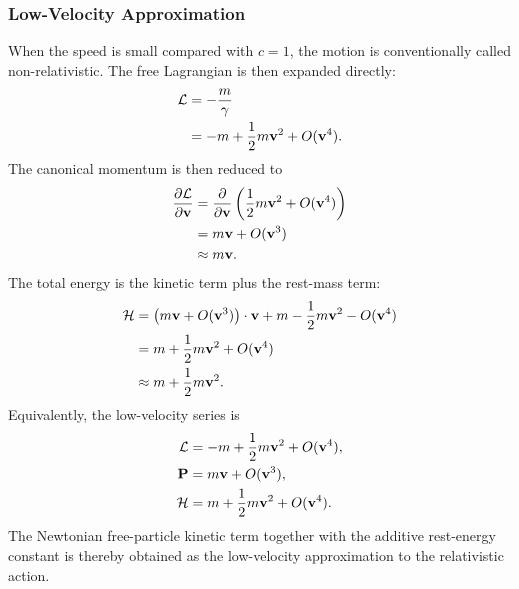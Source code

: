 \subsubsection{Low-Velocity Approximation}
When the speed is small compared with \(c=1\), the motion is conventionally
called non-relativistic. The free Lagrangian is then expanded directly:
\begin{align*}
\mathcal L
&=-\frac{m}{\gamma}\notag\\
&=-m+\frac12 m\mathbf{v}^2+O(\mathbf{v}^4).
\end{align*}
The canonical momentum is then reduced to
\begin{align*}
\frac{\partial\mathcal L}{\partial\mathbf{v}}
&=\frac{\partial}{\partial \mathbf{v}}\left(\frac12 m\mathbf{v}^2+O(\mathbf{v}^4)\right)\notag\\
&=m\mathbf{v}+O(\mathbf{v}^3)\notag\\
&\approx m\mathbf{v}.
\end{align*}
The total energy is the kinetic term plus the rest-mass term:
\begin{align*}
\mathcal H
&=\bigl(m\mathbf{v}+O(\mathbf{v}^3)\bigr)\cdot\mathbf{v}
+m-\frac12m\mathbf{v}^2-O(\mathbf{v}^4)\notag\\
&=m+\frac12m\mathbf{v}^2+O(\mathbf{v}^4)\notag\\
&\approx m+\frac12m\mathbf{v}^2.
\end{align*}
Equivalently, the low-velocity series is
\begin{align*}
\mathcal L&=-m+\frac12 m\mathbf{v}^2+O(\mathbf{v}^4),\notag \\
\mathbf{P}&=m\mathbf{v}+O(\mathbf{v}^{3}),\notag \\
\mathcal H&=m+\frac12 m\mathbf{v}^{2}+O(\mathbf{v}^{4}).
\end{align*}
The Newtonian free-particle kinetic term together with the additive
rest-energy constant is thereby obtained as the low-velocity approximation
to the relativistic action.
